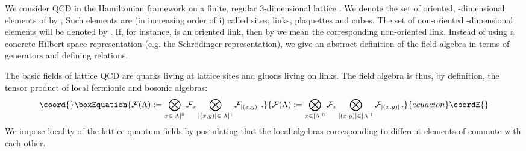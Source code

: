\documentclass[a4paper,12pt]{article}
\begin{document}
We consider QCD in the Hamiltonian framework on a finite, regular
3-dimensional lattice \myHighlight{$\Lambda$}\coordHE{}. We denote the set of oriented,
\coordHE{}-dimensional elements of \myHighlight{$\Lambda$}\coordHE{} by \coordHE{}, \coordHE{} Such elements are (in increasing order of i) called
sites, links, plaquettes and cubes. The set of non-oriented
\coordHE{}-dimensional elements will be denoted by \coordHE{}. If,
for instance, \coordHE{}  is an oriented link, then
by \coordHE{} we mean the corresponding
non-oriented link. Instead of using a concrete Hilbert space
representation (e.g. the Schr\"odinger representation), we give an
abstract definition of the field algebra in terms of generators
and defining relations.

The basic fields of lattice QCD are quarks living at lattice sites
and gluons living on links. The field algebra is thus, by
definition, the tensor product of local fermionic and bosonic
algebras:
\begin{equation}\coord{}\boxEquation{
\label{fieldalgebra} {\cal F}(\Lambda) :=  \bigotimes_{x \in
|\Lambda |^0} {\cal F}_x \bigotimes_{|(x,y)| \in |\Lambda |^1}
{\cal F}_{|(x,y)|} \, .
}{
{\cal F}(\Lambda) :=  \bigotimes_{x \in
|\Lambda |^0} {\cal F}_x \bigotimes_{|(x,y)| \in |\Lambda |^1}
{\cal F}_{|(x,y)|} \, .
}{ecuacion}\coordE{}\end{equation}
We impose locality of the lattice quantum fields by postulating
that the local algebras corresponding to different elements of
\myHighlight{$\Lambda$}\coordHE{} commute with each other.
\end{document}
